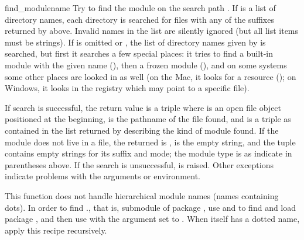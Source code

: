 \begin{funcdesc}{find_module}{name}
Try to find the module  on the search path .  If
 is a list of directory names, each directory is searched
for files with any of the suffixes returned by 
above.  Invalid names in the list are silently ignored (but all list
items must be strings).  If  is omitted or , the
list of directory names given by  is searched, but
first it searches a few special places: it tries to find a built-in
module with the given name (), then a frozen module
(), and on some systems some other places are looked
in as well (on the Mac, it looks for a resource ();
on Windows, it looks in the registry which may point to a specific
file).

If search is successful, the return value is a triple
 where
 is an open file object positioned at the beginning,
 is the pathname of the
file found, and  is a triple as contained in the list
returned by  describing the kind of module found.
If the module does not live in a file, the returned  is
,  is the empty string, and the
 tuple contains empty strings for its suffix and
mode; the module type is as indicate in parentheses above.  If the
search is unsuccessful,  is raised.  Other
exceptions indicate problems with the arguments or environment.

This function does not handle hierarchical module names (names
containing dots).  In order to find ., that is, submodule
 of package , use  and
 to find and load package , and then use
 with the  argument set to
.  When  itself has a dotted name, apply
this recipe recursively.
\end{funcdesc}

